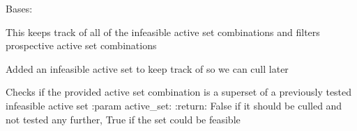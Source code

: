 \documentclass[letterpaper,10pt,english]{sphinxmanual}
\begin{document}
\begin{fulllineitems}
\label{\detokenize{mpo.mp_solvers:mpo.mp_solvers.mpqp_combinatorial.CombinationTester}}
\sphinxAtStartPar
Bases: 

\sphinxAtStartPar
This keeps track of all of the infeasible active set combinations and filters prospective active set combinations

\begin{fulllineitems}
\label{\detokenize{mpo.mp_solvers:mpo.mp_solvers.mpqp_combinatorial.CombinationTester.add}}
\sphinxAtStartPar
Added an infeasible active set to keep track of so we can cull later

\end{fulllineitems}


\begin{fulllineitems}
\label{\detokenize{mpo.mp_solvers:mpo.mp_solvers.mpqp_combinatorial.CombinationTester.check}}
\sphinxAtStartPar
Checks if the provided active set combination is a superset of a previously tested infeasible active set
:param active\_set:
:return: False if it should be culled and not tested any further, True if the set could be feasible

\end{fulllineitems}


\begin{fulllineitems}
\label{\detokenize{mpo.mp_solvers:mpo.mp_solvers.mpqp_combinatorial.CombinationTester.combos}}
\end{fulllineitems}


\end{fulllineitems}
\end{document}
